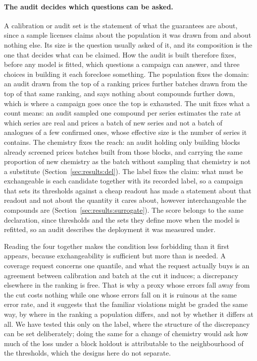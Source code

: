 \documentclass[twocolumn,10pt]{article}
\begin{document}
\paragraph{The audit decides which questions can be asked.} A calibration or audit set is the statement of what the guarantees are about, since a sample licenses claims about the population it was drawn from and about nothing else. Its size is the question usually asked of it, and its composition is the one that decides what can be claimed. How the audit is built therefore fixes, before any model is fitted, which questions a campaign can answer, and three choices in building it each foreclose something. The population fixes the domain: an audit drawn from the top of a ranking prices further batches drawn from the top of that same ranking, and says nothing about compounds further down, which is where a campaign goes once the top is exhausted. The unit fixes what a count means: an audit sampled one compound per series estimates the rate at which series are real and prices a batch of new series and not a batch of analogues of a few confirmed ones, whose effective size is the number of series it contains. The chemistry fixes the reach: an audit holding only building blocks already screened prices batches built from those blocks, and carrying the same proportion of new chemistry as the batch without sampling that chemistry is not a substitute (Section~\ref{sec:results:del}). The label fixes the claim: what must be exchangeable is each candidate together with its recorded label, so a campaign that sets its thresholds against a cheap readout has made a statement about that readout and not about the quantity it cares about, however interchangeable the compounds are (Section~\ref{sec:results:surrogate}). The score belongs to the same declaration, since thresholds and the sets they define move when the model is refitted, so an audit describes the deployment it was measured under.

Reading the four together makes the condition less forbidding than it first appears, because exchangeability is sufficient but more than is needed. A coverage request concerns one quantile, and what the request actually buys is an agreement between calibration and batch at the cut it induces; a discrepancy elsewhere in the ranking is free. That is why a proxy whose errors fall away from the cut costs nothing while one whose errors fall on it is ruinous at the same error rate, and it suggests that the familiar violations might be graded the same way, by where in the ranking a population differs, and not by whether it differs at all. We have tested this only on the label, where the structure of the discrepancy can be set deliberately; doing the same for a change of chemistry would ask how much of the loss under a block holdout is attributable to the neighbourhood of the thresholds, which the designs here do not separate.
\end{document}
